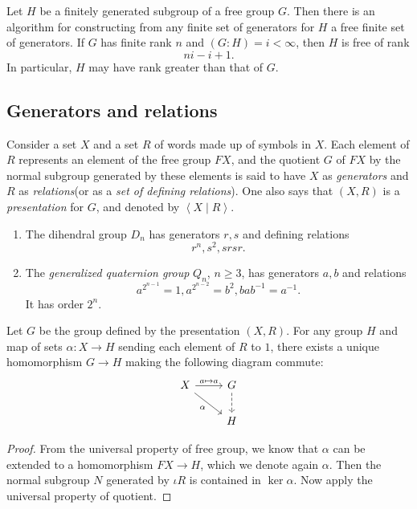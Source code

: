 \begin{proposition}
  Let \( H \) be a finitely generated subgroup of a free group \( G \). Then
  there is an algorithm for constructing from any finite set of generators for
  \( H \) a free finite set of generators. If \( G \) has finite rank \( n \)
  and \( (G: H) = i < \infty \), then \( H \) is free of rank
  \[
    ni - i + 1.
  \]
  In particular, \( H \) may have rank greater than that of \( G \).
\end{proposition}

\subsection{Generators and relations}

Consider a set \( X \) and a set \( R \) of words made up of symbols in \( X \).
Each element of \( R \) represents an element of the free group \( FX \), and
the quotient \( G \) of \( FX \) by the normal subgroup generated by these
elements is said to have \( X \) as \emph{generators} and \( R \) as
\emph{relations}(or as a \emph{set of defining relations}). One also says that
\( (X, R) \) is a \emph{presentation} for \( G \), and denoted by \(
\left\langle X \mid R \right\rangle \).

\begin{example}
  \begin{enumerate}
    \item The dihendral group \( D_n \) has generators \( r, s \) and defining
      relations
      \[
        r^n, s^2, srsr.
      \]
    \item The \emph{generalized quaternion group} \( Q_n \), \( n \geq 3 \), has
      generators \( a, b \) and relations
      \[
        a^{2^{n - 1}} = 1, a^{2^{n - 2}} = b^2, bab^{-1} = a^{-1}.
      \]
      It has order \( 2^n \).
  \end{enumerate}
\end{example}

\begin{proposition}
  Let \( G \) be the group defined by the presentation \( (X, R) \). For any
  group \( H \) and map of sets \( \alpha: X \to H \) sending each element of \(
  R \) to \( 1 \), there exists a unique homomorphism \( G \to H \) making the
  following diagram commute:
  \[\begin{tikzcd}
    X & G \\
    & H
    \arrow["{a \mapsto a}", from=1-1, to=1-2]
    \arrow["\alpha"', from=1-1, to=2-2]
    \arrow[dashed, from=1-2, to=2-2]
  \end{tikzcd}\]
\end{proposition}
\begin{proof}
  From the universal property of free group, we know that \( \alpha \) can be extended to a homomorphism \( FX \to H \), which we denote again \( \alpha \).
  Then the normal subgroup \( N \) generated by \( \iota R \) is contained in \( \ker \alpha \).
  Now apply the universal property of quotient.
\end{proof}

